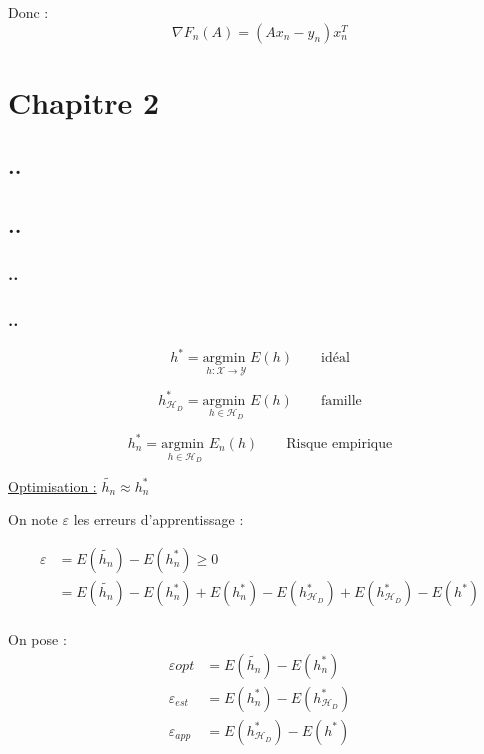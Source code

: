 \documentclass[12pt,a4paper]{article}
\begin{document}
Donc :
$$
\nabla F_n(A) = (Ax_n - y_n)x_n^T
$$


\section{Chapitre 2}

\subsection{..}
\subsection{..}
\subsubsection{..}
\subsubsection{..}

\begin{equation}
    h^* = \underset{h : \mathcal{X} \rightarrow \mathcal{Y}}{\text{argmin }} E(h) \qquad \text{idéal}
\end{equation}

$$
h_{\mathcal{H}_D}^* = \underset{h \in \mathcal{H}_D}{\text{argmin }} E(h) \qquad \text{famille}
$$

$$
h_{n}^* = \underset{h \in \mathcal{H}_D}{\text{argmin }} E_n(h) \qquad \text{Risque empirique}
$$

\underline{Optimisation :} $\tilde{h_n} \approx h_n^*$


On note $\varepsilon$ les erreurs d'apprentissage :

\begin{align*}
    \varepsilon &= E(\tilde{h_n}) - E(h_n^*) \geq 0\\
    &= E(\tilde{h_n}) - E(h_n^*) + E(h_n^*) - E(h_{\mathcal{H}_D}^*) + E(h_{\mathcal{H}_D}^*) - E(h^*)\\
\end{align*}

On pose :
\begin{align*}
    \varepsilon{opt} &= E(\tilde{h_n}) - E(h_n^*)\\
    \varepsilon_{est} &= E(h_n^*) - E(h_{\mathcal{H}_D}^*)\\
    \varepsilon_{app} &= E(h_{\mathcal{H}_D}^*) - E(h^*)\\
\end{align*}
\end{document}
